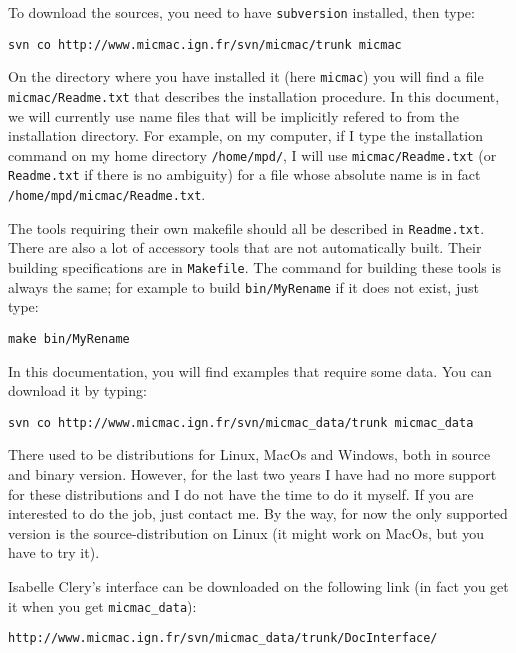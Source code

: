 To download the sources,  you need to have {\tt subversion} installed, 
then type:

\begin{verbatim}
svn co http://www.micmac.ign.fr/svn/micmac/trunk micmac 
\end{verbatim}

On the directory where you have installed it (here {\tt micmac})  you will find a 
file {\tt micmac/Readme.txt} that describes the installation procedure.
In this document, we will currently use name files that will
be implicitly refered to from the installation directory. For
example, on my computer, if I type the installation 
command on my home directory {\tt /home/mpd/}, I will use  {\tt micmac/Readme.txt}
(or  {\tt Readme.txt}  if there is no ambiguity)
for a file whose absolute name is in fact {\tt /home/mpd/micmac/Readme.txt}.


The tools requiring their own makefile should all be described in {\tt Readme.txt}.
There are also a lot of accessory tools that are not automatically built. Their 
building specifications are in {\tt Makefile}. The command for building these
tools is always the same; for example to build {\tt bin/MyRename}
if it does not exist, just type:

\begin{verbatim}
make bin/MyRename
\end{verbatim}


In this documentation, you will find examples that require some
data. You can download it by typing:

\begin{verbatim}
svn co http://www.micmac.ign.fr/svn/micmac_data/trunk micmac_data
\end{verbatim}

There used to be distributions for Linux, MacOs and Windows, both in source and binary
version. However, for the last two years I have had no more support for these distributions
and I do not have the time to do it myself. If you are interested to do the job,
just contact me. By the way, for now the only supported version is the source-distribution
on Linux (it might work on MacOs, but you have to try it).


Isabelle Clery's interface can be downloaded on the following link
(in fact you get it when you get {\tt micmac\_data}):

\begin{verbatim}
http://www.micmac.ign.fr/svn/micmac_data/trunk/DocInterface/
\end{verbatim}

